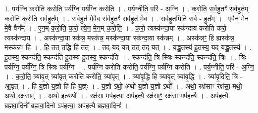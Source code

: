 \documentclass[17pt]{extarticle}
\begin{document}
1. पर्य॑ग्नि करोति करोति॒ पर्य॑ग्नि॒ पर्य॑ग्नि करोति । . पर्य॒ग्नीति॒ परि॑ - अ॒ग्नि॒ । . क॒रो॒ति॒ स॒र्व॒हुतꣳ॑ सर्व॒हुत॑म् करोति करोति सर्व॒हुत᳚म् । . स॒र्व॒हुत॑ मे॒वैव स॑र्व॒हुतꣳ॑ सर्व॒हुत॑ मे॒व । . स॒र्व॒हुत॒मिति॑ सर्व - हुत᳚म् । . ए॒वैन॑ मेन मे॒वै वैन᳚म् । . ए॒न॒म् क॒रो॒ति॒ क॒रो॒ त्ये॒न॒ मे॒न॒म् क॒रो॒ति॒ । . क॒रो॒ त्यस्क॑न्दा॒या स्क॑न्दाय करोति करो॒ त्यस्क॑न्दाय । . अस्क॑न्दा॒या स्क॑न्न॒ मस्क॑न्न॒ मस्क॑न्दा॒या स्क॑न्दा॒या स्क॑न्नम् । . अस्क॑न्नꣳ॒॒ हि ह्यस्क॑न्न॒ मस्क॑न्नꣳ॒॒ हि । . हि तत् तद्धि हि तत् । . तद् यद् यत् तत् तद् यत् । . यद्धु॒तस्य॑ हु॒तस्य॒ यद् यद्धु॒तस्य॑ । . हु॒तस्य॒ स्कन्द॑ति॒ स्कन्द॑ति हु॒तस्य॑ हु॒तस्य॒ स्कन्द॑ति । . स्कन्द॑ति॒ त्रि स्त्रिः स्कन्द॑ति॒ स्कन्द॑ति॒ त्रिः । . त्रिः पर्य॑ग्नि॒ पर्य॑ग्नि॒ त्रि स्त्रिः पर्य॑ग्नि । . पर्य॑ग्नि करोति करोति॒ पर्य॑ग्नि॒ पर्य॑ग्नि करोति । . पर्य॒ग्नीति॒ परि॑ - अ॒ग्नि॒ । . क॒रो॒ति॒ त्र्या॑वृ॒त् त्र्या॑वृत् करोति करोति॒ त्र्या॑वृत् । . त्र्या॑वृ॒द्धि हि त्र्या॑वृ॒त् त्र्या॑वृ॒द्धि । . त्र्या॑वृ॒दिति॒ त्रि - आ॒वृ॒त् । . हि य॒ज्ञो य॒ज्ञो हि हि य॒ज्ञ्ः । . य॒ज्ञो ऽथो॒ अथो॑ य॒ज्ञो य॒ज्ञो ऽथो᳚ । . अथो॒ रक्ष॑साꣳ॒॒ रक्ष॑सा॒ मथो॒ अथो॒ रक्ष॑साम् । . अथो॒ इत्यथो᳚ । . रक्ष॑सा॒ मप॑हत्या॒ अप॑हत्यै॒ रक्ष॑साꣳ॒॒ रक्ष॑सा॒ मप॑हत्यै । . अप॑हत्यै ब्रह्मवा॒दिनो᳚ ब्रह्मवा॒दिनो ऽप॑हत्या॒ अप॑हत्यै ब्रह्मवा॒दिनः॑ । \newline
\end{document}
